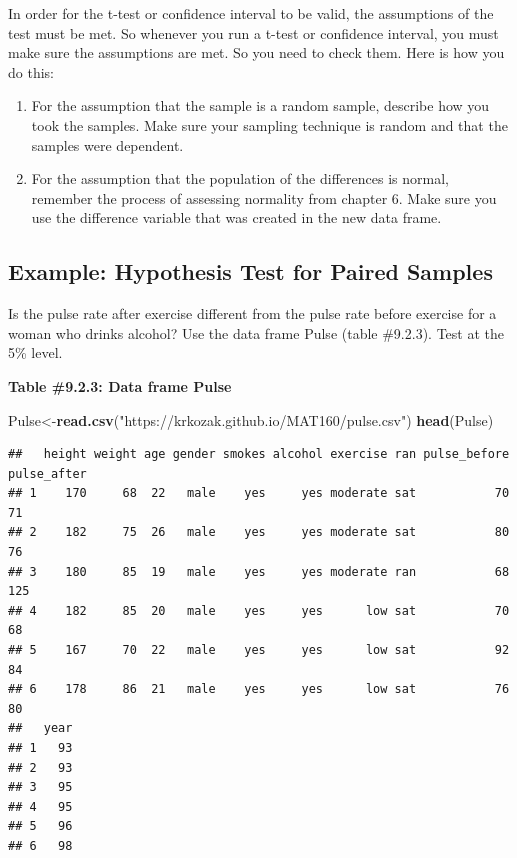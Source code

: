 \documentclass[
]{book}
\newenvironment{Shaded}{\begin{snugshade}}{\end{snugshade}}
\newcommand{\KeywordTok}[1]{\textcolor[rgb]{0.13,0.29,0.53}{\textbf{#1}}}
\newcommand{\NormalTok}[1]{#1}
\newcommand{\StringTok}[1]{\textcolor[rgb]{0.31,0.60,0.02}{#1}}
\begin{document}
In order for the t-test or confidence interval to be valid, the assumptions of the test must be met. So whenever you run a t-test or confidence interval, you must make sure the assumptions are met. So you need to check them. Here is how you do this:

\begin{enumerate}
\def\labelenumi{\arabic{enumi}.}
\item
  For the assumption that the sample is a random sample, describe how you took the samples. Make sure your sampling technique is random and that the samples were dependent.
\item
  For the assumption that the population of the differences is normal, remember the process of assessing normality from chapter 6. Make sure you use the difference variable that was created in the new data frame.
\end{enumerate}

\hypertarget{example-hypothesis-test-for-paired-samples}{%
\subsection{Example: Hypothesis Test for Paired Samples}\label{example-hypothesis-test-for-paired-samples}}

Is the pulse rate after exercise different from the pulse rate before exercise for a woman who drinks alcohol? Use the data frame Pulse (table \#9.2.3). Test at the 5\% level.

\textbf{Table \#9.2.3: Data frame Pulse}

\begin{Shaded}
\begin{Highlighting}[]
\NormalTok{Pulse<-}\KeywordTok{read.csv}\NormalTok{(}\StringTok{"https://krkozak.github.io/MAT160/pulse.csv"}\NormalTok{)}
\KeywordTok{head}\NormalTok{(Pulse)}
\end{Highlighting}
\end{Shaded}

\begin{verbatim}
##   height weight age gender smokes alcohol exercise ran pulse_before pulse_after
## 1    170     68  22   male    yes     yes moderate sat           70          71
## 2    182     75  26   male    yes     yes moderate sat           80          76
## 3    180     85  19   male    yes     yes moderate ran           68         125
## 4    182     85  20   male    yes     yes      low sat           70          68
## 5    167     70  22   male    yes     yes      low sat           92          84
## 6    178     86  21   male    yes     yes      low sat           76          80
##   year
## 1   93
## 2   93
## 3   95
## 4   95
## 5   96
## 6   98
\end{verbatim}
\end{document}
